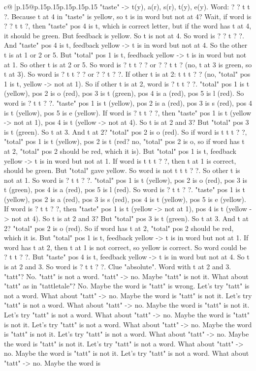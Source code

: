 \documentclass{article}
\begin{document}
{\begin{supertabular}{c@{$\;$}|p{.15\linewidth}@{}p{.15\linewidth}p{.15\linewidth}p{.15\linewidth}p{.15\linewidth}p{.15\linewidth}}
{{{"taste" {-}> t(y), a(r), s(r), t(y), e(y). Word: ? ? t t ?. Because t at 4 in "taste" is yellow, so t is in word but not at 4? Wait, if word is ? ? t t ?, then "taste" pos 4 is t, which is correct letter, but if the word has t at 4, it should be green. But feedback is yellow. So t is not at 4. So word is ? ? t ? ?. And "taste" pos 4 is t, feedback yellow {-}> t is in word but not at 4. So the other t is at 1 or 2 or 5. But "total" pos 1 is t, feedback yellow {-}> t is in word but not at 1. So other t is at 2 or 5. So word is ? t t ? ? or ? ? t t ? (no, t at 3 is green, so t at 3). So word is ? t t ? ? or ? ? t ? ?. If other t is at 2: t t t ? ? (no, "total" pos 1 is t, yellow {-}> not at 1). So if other t is at 2, word is ? t t ? ?. "total" pos 1 is t (yellow), pos 2 is o (red), pos 3 is t (green), pos 4 is a (red), pos 5 is l (red). So word is ? t t ? ?. "taste" pos 1 is t (yellow), pos 2 is a (red), pos 3 is s (red), pos 4 is t (yellow), pos 5 is e (yellow). If word is ? t t ? ?, then "taste" pos 1 is t (yellow {-}> not at 1), pos 4 is t (yellow {-}> not at 4). So t is at 2 and 3? But "total" pos 3 is t (green). So t at 3. And t at 2? "total" pos 2 is o (red). So if word is t t t ? ?, "total" pos 1 is t (yellow), pos 2 is t (red? no, "total" pos 2 is o, so if word has t at 2, "total" pos 2 should be red, which it is). But "total" pos 1 is t, feedback yellow {-}> t is in word but not at 1. If word is t t t ? ?, then t at 1 is correct, should be green. But "total" gave yellow. So word is not t t t ? ?. So other t is not at 1. So word is ? t t ? ?. "total" pos 1 is t (yellow), pos 2 is o (red), pos 3 is t (green), pos 4 is a (red), pos 5 is l (red). So word is ? t t ? ?. "taste" pos 1 is t (yellow), pos 2 is a (red), pos 3 is s (red), pos 4 is t (yellow), pos 5 is e (yellow). If word is ? t t ? ?, then "taste" pos 1 is t (yellow {-}> not at 1), pos 4 is t (yellow {-}> not at 4). So t is at 2 and 3? But "total" pos 3 is t (green). So t at 3. And t at 2? "total" pos 2 is o (red). So if word has t at 2, "total" pos 2 should be red, which it is. But "total" pos 1 is t, feedback yellow {-}> t is in word but not at 1. If word has t at 2, then t at 1 is not correct, so yellow is correct. So word could be ? t t ? ?. But "taste" pos 4 is t, feedback yellow {-}> t is in word but not at 4. So t is at 2 and 3. So word is ? t t ? ?. Clue "absolute". Word with t at 2 and 3. "tatt"? No. "tatt" is not a word. "tatt" {-}> no. Maybe "tatt" is not it. What about "tatt" as in "tattletale"? No. Maybe the word is "tatt" is wrong. Let's try "tatt" is not a word. What about "tatt" {-}> no. Maybe the word is "tatt" is not it. Let's try "tatt" is not a word. What about "tatt" {-}> no. Maybe the word is "tatt" is not it. Let's try "tatt" is not a word. What about "tatt" {-}> no. Maybe the word is "tatt" is not it. Let's try "tatt" is not a word. What about "tatt" {-}> no. Maybe the word is "tatt" is not it. Let's try "tatt" is not a word. What about "tatt" {-}> no. Maybe the word is "tatt" is not it. Let's try "tatt" is not a word. What about "tatt" {-}> no. Maybe the word is "tatt" is not it. Let's try "tatt" is not a word. What about "tatt" {-}> no. Maybe the word is }}}
\end{supertabular}}
\end{document}

